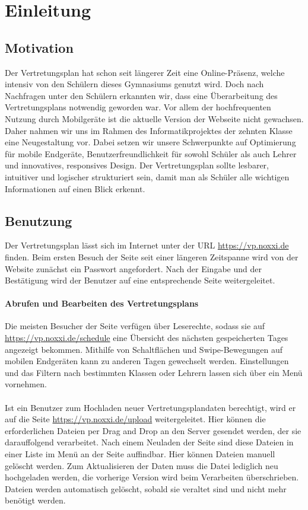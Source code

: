 \chapter{Einleitung}
\section{Motivation}
Der Vertretungsplan hat schon seit längerer Zeit eine Online-Präsenz, welche
intensiv von den Schülern dieses Gymnasiums genutzt wird. Doch nach Nachfragen unter den Schülern
erkannten wir, dass eine Überarbeitung des Vertretungsplans notwendig geworden war. Vor allem der
hochfrequenten Nutzung durch Mobilgeräte ist die aktuelle Version der Webseite nicht gewachsen.
Daher nahmen  wir uns im Rahmen des Informatikprojektes der zehnten Klasse eine Neugestaltung vor.
Dabei setzen wir unsere Schwerpunkte auf Optimierung für mobile Endgeräte, Benutzerfreundlichkeit
für sowohl Schüler als auch Lehrer und innovatives, responsives Design. Der Vertretungsplan sollte
lesbarer, intuitiver und logischer strukturiert sein, damit man als Schüler alle wichtigen Informationen
auf einen Blick erkennt.

\section{Benutzung}
Der Vertretungsplan lässt sich im Internet unter der URL \url{https://vp.noxxi.de} finden.
Beim ersten Besuch der Seite seit einer längeren Zeitspanne wird von der Website zunächst ein
Passwort angefordert. Nach der Eingabe und der Bestätigung wird der Benutzer auf eine entsprechende
Seite weitergeleitet.

\subsubsection{Abrufen und Bearbeiten des Vertretungsplans}
Die meisten Besucher der Seite verfügen über Leserechte, sodass sie auf \url{https://vp.noxxi.de/schedule}
eine Übersicht des nächsten gespeicherten Tages angezeigt bekommen. Mithilfe von Schaltflächen und
Swipe-Bewegungen auf mobilen Endgeräten kann zu anderen Tagen gewechselt werden. Einstellungen und das Filtern
nach bestimmten Klassen oder Lehrern lassen sich über ein Menü vornehmen.\\\\
Ist ein Benutzer zum Hochladen neuer Vertretungsplandaten berechtigt, wird er auf die Seite
\url{https://vp.noxxi.de/upload} weitergeleitet. Hier können die erforderlichen Dateien per Drag and Drop
an den Server gesendet werden, der sie darauffolgend verarbeitet. Nach einem Neuladen der Seite sind
diese Dateien in einer Liste im Menü an der Seite auffindbar. Hier können Dateien manuell gelöscht werden.
Zum Aktualisieren der Daten muss die Datei lediglich neu hochgeladen werden, die vorherige Version wird
beim Verarbeiten überschrieben. Dateien werden automatisch gelöscht, sobald sie veraltet sind und nicht
mehr benötigt werden.
